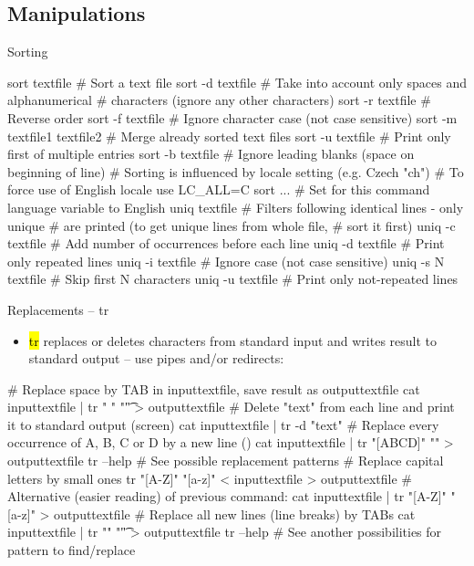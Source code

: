 \documentclass[compress, ucs, xelatex, 11pt, xcolor=svgnames,
  hyperref={
    bookmarks=true,
    unicode=true,
    colorlinks=true,
    pdftitle={Linux, command line and MetaCentrum},
    plainpages=false,
    pdfauthor={Vojtech Zeisek},
    pdfsubject={Course about use of Linux command line, writing shell scripts and using MetaCentrum of CESNET},
    pdfcreator={XeLaTeX},
    pdfkeywords={Linux, GNU, BASH, shell, command line, MetaCentrum},
    linkcolor=DarkRed,
    anchorcolor=DarkBlue,
    citecolor=Indigo,
    filecolor=NavyBlue,
    menucolor=DarkMagenta,
    urlcolor=DarkBlue,
    pdftex},
  url={hyphens, lowtilde} %
  ]{beamer}
\renewcommand{\texttt}[1]{\hl{\ttfamily #1}}
\begin{document}
\subsection{Manipulations}

\begin{frame}[fragile]{Sorting}
  \begin{bashcode}
    sort textfile # Sort a text file
    sort -d textfile # Take into account only spaces and alphanumerical
                     # characters (ignore any other characters)
    sort -r textfile # Reverse order
    sort -f textfile # Ignore character case (not case sensitive)
    sort -m textfile1 textfile2 # Merge already sorted text files
    sort -u textfile # Print only first of multiple entries
    sort -b textfile # Ignore leading blanks (space on beginning of line)
    # Sorting is influenced by locale setting (e.g. Czech "ch")
    # To force use of English locale use
    LC_ALL=C sort ... # Set for this command language variable to English
    uniq textfile # Filters following identical lines - only unique
                  # are printed (to get unique lines from whole file,
                  # sort it first)
    uniq -c textfile # Add number of occurrences before each line
    uniq -d textfile # Print only repeated lines
    uniq -i textfile # Ignore case (not case sensitive)
    uniq -s N textfile # Skip first N characters
    uniq -u textfile # Print only not-repeated lines
  \end{bashcode}
\end{frame}

\begin{frame}[fragile]{Replacements -- tr}
  \begin{itemize}
    \item \texttt{tr} replaces or deletes characters from standard input and writes result to standard output -- use pipes and/or redirects:
  \end{itemize}
  \begin{bashcode}
    # Replace space by TAB in inputtextfile, save result as outputtextfile
    cat inputtextfile | tr " " "\t" > outputtextfile
    # Delete "text" from each line and print it to standard output (screen)
    cat inputtextfile | tr -d "text"
    # Replace every occurrence of A, B, C or D by a new line (\n)
    cat inputtextfile | tr "[ABCD]" "\n" > outputtextfile
    tr --help # See possible replacement patterns
    # Replace capital letters by small ones
    tr "[A-Z]" "[a-z]" < inputtextfile > outputtextfile
    # Alternative (easier reading) of previous command:
    cat inputtextfile | tr "[A-Z]" "[a-z]" > outputtextfile
    # Replace all new lines (line breaks) by TABs
    cat inputtextfile | tr "\n" "\t"  > outputtextfile
    tr --help # See another possibilities for pattern to find/replace
  \end{bashcode}
\end{frame}
\end{document}
